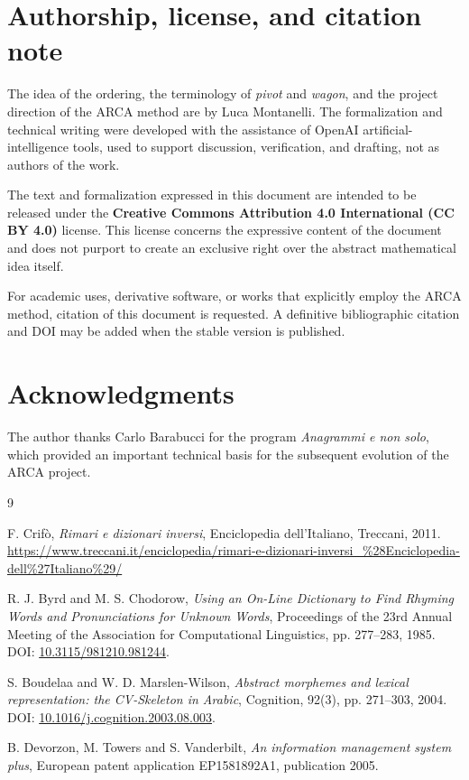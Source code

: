 \documentclass[11pt,a4paper]{article}
\theoremstyle{definition}
\theoremstyle{remark}
\begin{document}
\section*{Authorship, license, and citation note}

The idea of the ordering, the terminology of \emph{pivot} and \emph{wagon}, and the project direction of the ARCA method are by Luca Montanelli. The formalization and technical writing were developed with the assistance of OpenAI artificial-intelligence tools, used to support discussion, verification, and drafting, not as authors of the work.

The text and formalization expressed in this document are intended to be released under the \textbf{Creative Commons Attribution 4.0 International (CC BY 4.0)} license. This license concerns the expressive content of the document and does not purport to create an exclusive right over the abstract mathematical idea itself.

For academic uses, derivative software, or works that explicitly employ the ARCA method, citation of this document is requested. A definitive bibliographic citation and DOI may be added when the stable version is published.

\section*{Acknowledgments}

The author thanks Carlo Barabucci for the program \emph{Anagrammi e non solo}, which provided an important technical basis for the subsequent evolution of the ARCA project.

\begin{thebibliography}{9}

F. Crifò,
\emph{Rimari e dizionari inversi},
Enciclopedia dell'Italiano, Treccani, 2011.
\url{https://www.treccani.it/enciclopedia/rimari-e-dizionari-inversi_%28Enciclopedia-dell%27Italiano%29/}

R. J. Byrd and M. S. Chodorow,
\emph{Using an On-Line Dictionary to Find Rhyming Words and Pronunciations for Unknown Words},
Proceedings of the 23rd Annual Meeting of the Association for Computational Linguistics, pp. 277--283, 1985.
DOI: \href{https://doi.org/10.3115/981210.981244}{10.3115/981210.981244}.

S. Boudelaa and W. D. Marslen-Wilson,
\emph{Abstract morphemes and lexical representation: the CV-Skeleton in Arabic},
Cognition, 92(3), pp. 271--303, 2004.
DOI: \href{https://doi.org/10.1016/j.cognition.2003.08.003}{10.1016/j.cognition.2003.08.003}.

B. Devorzon, M. Towers and S. Vanderbilt,
\emph{An information management system plus},
European patent application EP1581892A1, publication 2005.

\end{thebibliography}
\end{document}
